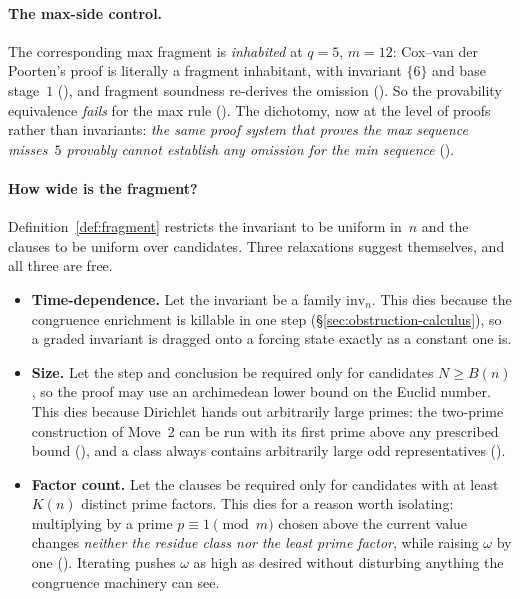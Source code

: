 \paragraph{The max-side control.}
The corresponding max fragment is \emph{inhabited} at $q = 5$,
$m = 12$: Cox--van der Poorten's proof is literally a fragment
inhabitant, with invariant $\{6\}$ and base stage~$1$
(), and fragment
soundness re-derives the omission
().  So
the provability equivalence \emph{fails} for the max rule
().  The
dichotomy, now at the level of proofs rather than invariants: \emph{the
same proof system that proves the max sequence misses~$5$ provably
cannot establish any omission for the min sequence}
().

\paragraph{How wide is the fragment?}
Definition~\ref{def:fragment} restricts the invariant to be uniform
in~$n$ and the clauses to be uniform over candidates.  Three relaxations
suggest themselves, and all three are free.

\begin{itemize}[leftmargin=*]
\item \textbf{Time-dependence.}  Let the invariant be a family
  $\mathrm{inv}_n$.  This dies because the congruence enrichment is
  killable in one step (\S\ref{sec:obstruction-calculus}), so a graded
  invariant is dragged onto a forcing state exactly as a constant one
  is.
\item \textbf{Size.}  Let the step and conclusion be required only for
  candidates $N \geq B(n)$, so the proof may use an archimedean lower
  bound on the Euclid number.  This dies because Dirichlet hands out
  arbitrarily large primes: the two-prime construction of
  Move~2 can be run with its first prime above any prescribed bound
  (), and
  a class always contains arbitrarily large odd representatives
  ().
\item \textbf{Factor count.}  Let the clauses be required only for
  candidates with at least $K(n)$ distinct prime factors.  This dies for
  a reason worth isolating: multiplying by a prime $p \equiv 1
  \pmod m$ chosen above the current value changes \emph{neither the
  residue class nor the least prime factor}, while raising $\omega$
  by one
  ().
  Iterating pushes $\omega$ as high as desired without disturbing
  anything the congruence machinery can see.
\end{itemize}

